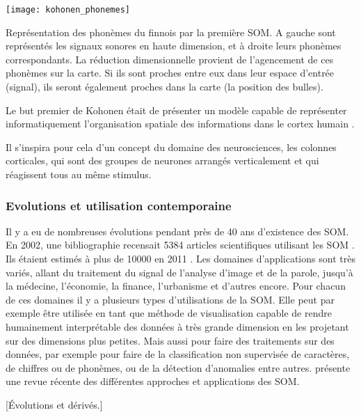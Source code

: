 	\begin{figureth}
		\texttt{[image: kohonen\_phonemes]}
		\caption[Phonème SOM]{Représentation des phonèmes du finnois par la première SOM. A gauche sont représentés les signaux sonores en haute dimension, et à droite leurs phonèmes correspondants. La réduction dimensionnelle provient de l'agencement de ces phonèmes sur la carte. Si ils sont proches entre eux dans leur espace d'entrée (signal), ils seront également proches dans la carte (la position des bulles)\footnotemark .}\label{fig:img:phonemes}

	\end{figureth}


	Le but premier de Kohonen était de présenter un modèle capable de représenter informatiquement l'organisation spatiale des informations dans le cortex humain \cite{kohonen-memory}. 
	
	Il s'inspira pour cela d'un concept du domaine des neurosciences, les colonnes corticales, qui sont des groupes de neurones arrangés verticalement et qui réagissent tous au même stimulus.

\subsubsection{Evolutions et utilisation contemporaine}
	Il y a eu de nombreuses évolutions pendant près de 40 ans d'existence des SOM. En 2002, une bibliographie recensait 5384 articles scientifiques utilisant les SOM \cite{oja2003bibliography}. Ils étaient estimés à plus de 10000 en 2011 \cite{bilbiography-finuni}. Les domaines d'applications sont très variés, allant du traitement du signal de l'analyse d'image et de la parole, jusqu'à la médecine, l'économie, la finance, l'urbanisme et d'autres encore. Pour chacun de ces domaines il y a plusieurs types d'utilisations de la SOM. Elle peut par exemple être utilisée en tant que méthode de visualisation capable de rendre humainement interprétable des données à très grande dimension en les projetant sur des dimensions plus petites. Mais aussi pour faire des traitements sur des données, par exemple pour faire de la classification non supervisée de caractères, de chiffres ou de phonèmes, ou de la détection d'anomalies entre autres. \cite{cottrell2018self} présente une revue récente des différentes approches et applications des SOM. 

	[Évolutions et dérivés.]

